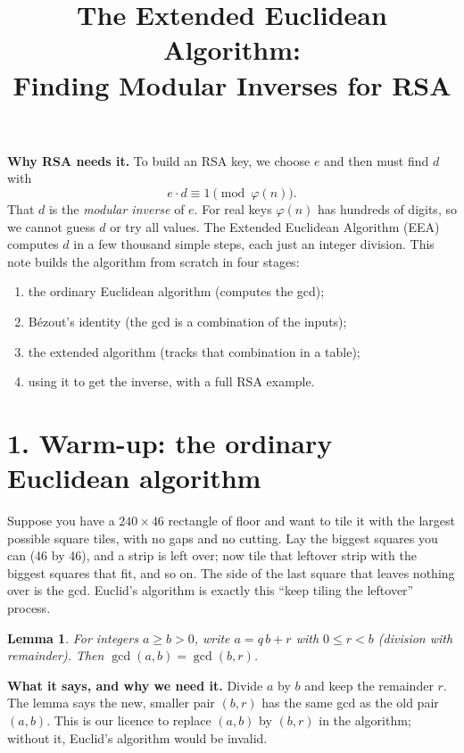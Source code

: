 \documentclass[11pt]{article}
\title{\textbf{The Extended Euclidean Algorithm:\\ Finding Modular Inverses for RSA}}
\author{}
\date{}
\newtheorem{lemma}{Lemma}
\begin{document}
\maketitle
\vspace{-2.5em}

\textbf{Why RSA needs it.} To build an RSA key, we choose $e$ and then must find $d$ with
\[
e\cdot d\equiv 1 \pmod{\varphi(n)}.
\]
That $d$ is the \emph{modular inverse} of $e$. For real keys $\varphi(n)$ has hundreds of digits, so we cannot guess $d$ or try all values. The Extended Euclidean Algorithm (EEA) computes $d$ in a few thousand simple steps, each just an integer division. This note builds the algorithm from scratch in four stages:
\begin{enumerate}[nosep]
\item the ordinary Euclidean algorithm (computes the gcd);
\item B\'ezout's identity (the gcd is a combination of the inputs);
\item the extended algorithm (tracks that combination in a table);
\item using it to get the inverse, with a full RSA example.
\end{enumerate}

\hrulefill

\section*{1. Warm-up: the ordinary Euclidean algorithm}

\begin{intuition}
Suppose you have a $240\times 46$ rectangle of floor and want to tile it with the largest possible square tiles, with no gaps and no cutting. Lay the biggest squares you can (46 by 46), and a strip is left over; now tile that leftover strip with the biggest squares that fit, and so on. The side of the last square that leaves nothing over is the gcd. Euclid's algorithm is exactly this ``keep tiling the leftover'' process.
\end{intuition}

\begin{lemma}
For integers $a\ge b>0$, write $a=q\,b+r$ with $0\le r<b$ (division with remainder). Then $\gcd(a,b)=\gcd(b,r)$.
\end{lemma}

\textbf{What it says, and why we need it.} Divide $a$ by $b$ and keep the remainder $r$. The lemma says the new, smaller pair $(b,r)$ has the same gcd as the old pair $(a,b)$. This is our licence to replace $(a,b)$ by $(b,r)$ in the algorithm; without it, Euclid's algorithm would be invalid.
\end{document}
